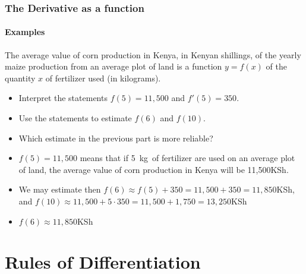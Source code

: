 \documentclass[9pt,xcolor=x11names,compress]{beamer}
\begin{document}
\begin{frame}\frametitle{The Derivative as a function}
\framesubtitle{Examples}
\begin{example}
	The average value of corn production in Kenya, in Kenyan shillings, of the yearly maize production from an average plot of land is a function $y=f(x)$ of the quantity $x$ of fertilizer used (in kilograms).
	\begin{itemize}
		\item \alert<2-3>{Interpret the statements $f(5)=11,500$ and $f'(5)=350$.}
		\item \alert<4>{Use the statements to estimate $f(6)$ and $f(10)$.}
		\item \alert<5>{Which estimate in the previous part is more reliable?}
	\end{itemize}
\end{example}
\begin{itemize}
	\item<2-> $f(5)=11,500$ means that if 5~kg~of fertilizer are used on an average plot of land, the average value of corn production in Kenya will be 11,500KSh. 

	\item<4-> We may estimate then $f(6)\approx f(5)+350=11,500+350=11,850$KSh, and $f(10)\approx 11,500+5\cdot 350=11,500+1,750=13,250$KSh
	\item<5-> $f(6)\approx 11,850$KSh
\end{itemize}
\end{frame}

\section{Rules of Differentiation}
\end{document}
